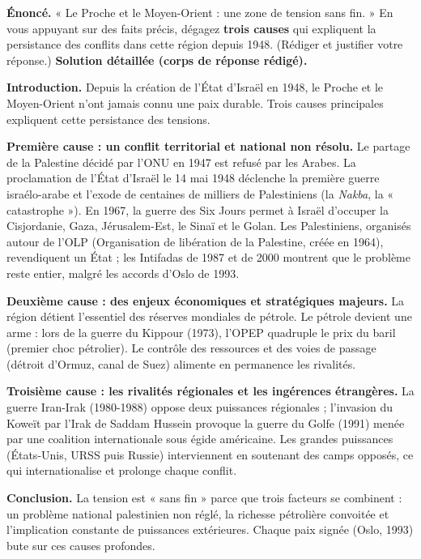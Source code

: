 \documentclass[11pt]{article}
\newcommand{\cle}[1]{{\popxbold\color{popdark}#1}}
\begin{document}
\begin{exoresolu}
\textbf{Énoncé.} « Le Proche et le Moyen-Orient : une zone de tension sans fin. » En vous appuyant sur des faits précis, dégagez \textbf{trois causes} qui expliquent la persistance des conflits dans cette région depuis 1948. (Rédiger et justifier votre réponse.)
\tcblower
\textbf{Solution détaillée (corps de réponse rédigé).}

\textbf{Introduction.} Depuis la création de l'État d'Israël en 1948, le Proche et le Moyen-Orient n'ont jamais connu une paix durable. Trois causes principales expliquent cette persistance des tensions.

\textbf{Première cause : un conflit territorial et national non résolu.} Le partage de la Palestine décidé par l'ONU en 1947 est refusé par les Arabes. La proclamation de l'État d'Israël le 14 mai 1948 déclenche la première guerre israélo-arabe et l'exode de centaines de milliers de Palestiniens (la \emph{Nakba}, la « catastrophe »). En 1967, la guerre des Six Jours permet à Israël d'occuper la Cisjordanie, Gaza, Jérusalem-Est, le Sinaï et le Golan. Les Palestiniens, organisés autour de l'\cle{OLP} (Organisation de libération de la Palestine, créée en 1964), revendiquent un État ; les Intifadas de 1987 et de 2000 montrent que le problème reste entier, malgré les accords d'\cle{Oslo} de 1993.

\textbf{Deuxième cause : des enjeux économiques et stratégiques majeurs.} La région détient l'essentiel des réserves mondiales de pétrole. Le pétrole devient une arme : lors de la guerre du Kippour (1973), l'OPEP quadruple le prix du baril (premier choc pétrolier). Le contrôle des ressources et des voies de passage (détroit d'Ormuz, canal de Suez) alimente en permanence les rivalités.

\textbf{Troisième cause : les rivalités régionales et les ingérences étrangères.} La guerre Iran-Irak (1980-1988) oppose deux puissances régionales ; l'invasion du Koweït par l'Irak de Saddam Hussein provoque la guerre du Golfe (1991) menée par une coalition internationale sous égide américaine. Les grandes puissances (États-Unis, URSS puis Russie) interviennent en soutenant des camps opposés, ce qui internationalise et prolonge chaque conflit.

\textbf{Conclusion.} La tension est « sans fin » parce que trois facteurs se combinent : un problème national palestinien non réglé, la richesse pétrolière convoitée et l'implication constante de puissances extérieures. Chaque paix signée (Oslo, 1993) bute sur ces causes profondes.
\end{exoresolu}
\end{document}
